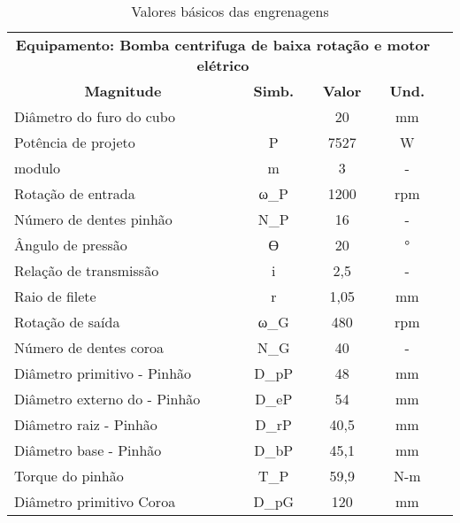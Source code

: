 \begin{table}[]
\centering
\caption{\label{tab:3} Valores básicos das engrenagens}
\begin{tabular}{l c c c c}
\hline
\multicolumn{4}{c}{\textbf{Equipamento: Bomba centrifuga de baixa rotação e motor elétrico}} \\
\multicolumn{1}{c}{\textbf{Magnitude}}  & \textbf{Simb.}  & \textbf{Valor}  & \textbf{Und.}  \\
Diâmetro do furo do cubo                &                & 20              & mm             \\
Potência de projeto                     & P               & 7527            & W              \\
modulo                                  & m               & 3               & -              \\
Rotação de entrada                      & ω_P              & 1200            & rpm            \\
Número de dentes pinhão                 & N_P              & 16              & -              \\
Ângulo de pressão                       & ϴ              & 20              & °              \\
Relação de transmissão                  & i               & 2,5             & -              \\
Raio de filete                          & r               & 1,05            & mm             \\
Rotação de saída                        & ω_G              & 480             & rpm            \\
Número de dentes coroa                  & N_G              & 40              & -              \\
Diâmetro primitivo - Pinhão             & D_pP             & 48              & mm             \\
Diâmetro externo do - Pinhão            & D_eP             & 54              & mm             \\
Diâmetro raiz - Pinhão                  & D_rP             & 40,5            & mm             \\
Diâmetro base - Pinhão                  & D_bP             & 45,1            & mm             \\
Torque do pinhão                        & T_P              & 59,9            & N-m            \\
Diâmetro primitivo Coroa                & D_pG             & 120             & mm             \\

\end{tabular}
\end{table}
